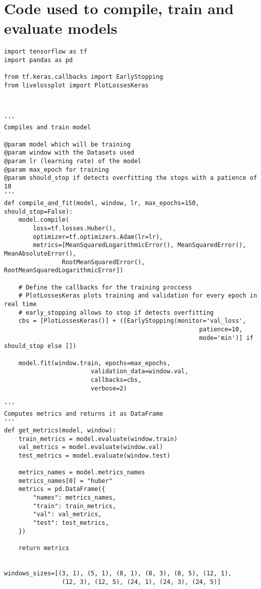 \section{Code used to compile, train and evaluate models} \label{app:compile_and_fit}

\begin{verbatim}
import tensorflow as tf
import pandas as pd

from tf.keras.callbacks import EarlyStopping
from livelossplot import PlotLossesKeras



'''
Compiles and train model

@param model which will be training
@param window with the Datasets used
@param lr (learning rate) of the model
@param max_epoch for training
@param should_stop if detects overfitting the stops with a patience of 10
'''
def compile_and_fit(model, window, lr, max_epochs=150, should_stop=False):
    model.compile(
        loss=tf.losses.Huber(),
        optimizer=tf.optimizers.Adam(lr=lr),
        metrics=[MeanSquaredLogarithmicError(), MeanSquaredError(), MeanAbsoluteError(),
                RootMeanSquaredError(), RootMeanSquaredLogarithmicError])
    
    # Define the callbacks for the training proccess
    # PlotLossesKeras plots training and validation for every epoch in real time
    # early_stopping allows to stop if detects overfitting
    cbs = [PlotLossesKeras()] + ([EarlyStopping(monitor='val_loss',
                                                      patience=10,
                                                      mode='min')] if should_stop else [])
    
    model.fit(window.train, epochs=max_epochs,
                        validation_data=window.val,
                        callbacks=cbs,
                        verbose=2)
    
'''
Computes metrics and returns it as DataFrame
'''
def get_metrics(model, window):
    train_metrics = model.evaluate(window.train)
    val_metrics = model.evaluate(window.val)
    test_metrics = model.evaluate(window.test)

    metrics_names = model.metrics_names
    metrics_names[0] = "huber"
    metrics = pd.DataFrame({
        "names": metrics_names,
        "train": train_metrics,
        "val": val_metrics,
        "test": test_metrics,
    })

    return metrics


windows_sizes=[(3, 1), (5, 1), (8, 1), (8, 3), (8, 5), (12, 1), 
                (12, 3), (12, 5), (24, 1), (24, 3), (24, 5)]


\end{verbatim}
